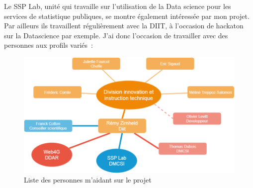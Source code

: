 Le SSP Lab, unité qui travaille sur l'utilisation de la Data science pour les services de statistique publiques, se montre également intéressée par mon projet. Par ailleurs ils travaillent régulièrement avec la DIIT, à l'occasion de hackaton sur la Datascience par exemple. J'ai donc l'occasion de travailler avec des personnes aux profils variés~:
\vspace{10pt}
\begin{figure}[H]
  \centering
  \includegraphics[scale=0.45]{images/Organigramme-stage.png}
  \caption{Liste des personnes m'aidant sur le projet}
  \label{fig:Organigramme}
\end{figure}

\vspace{20pt}

